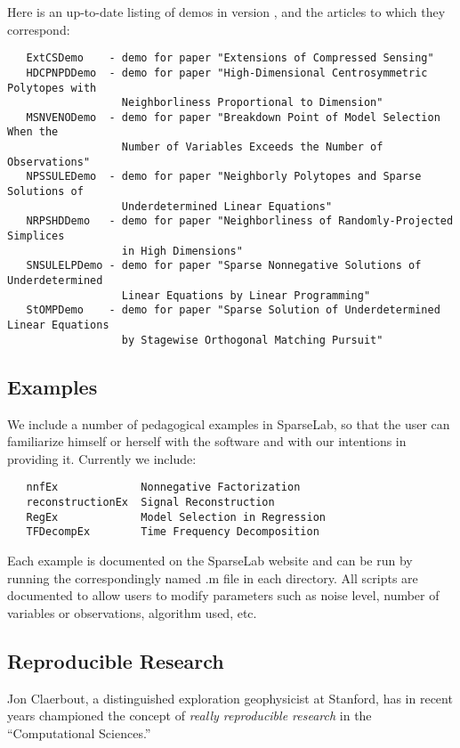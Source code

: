 \documentclass{article}
\begin{document}
Here is an up-to-date listing of demos in version \WLVersion,
and the articles to which they correspond:
\begin{verbatim}
   ExtCSDemo    - demo for paper "Extensions of Compressed Sensing"
   HDCPNPDDemo  - demo for paper "High-Dimensional Centrosymmetric Polytopes with
                  Neighborliness Proportional to Dimension"
   MSNVENODemo  - demo for paper "Breakdown Point of Model Selection When the
                  Number of Variables Exceeds the Number of Observations"
   NPSSULEDemo  - demo for paper "Neighborly Polytopes and Sparse Solutions of
                  Underdetermined Linear Equations"
   NRPSHDDemo   - demo for paper "Neighborliness of Randomly-Projected Simplices
                  in High Dimensions"
   SNSULELPDemo - demo for paper "Sparse Nonnegative Solutions of Underdetermined
                  Linear Equations by Linear Programming"
   StOMPDemo    - demo for paper "Sparse Solution of Underdetermined Linear Equations
                  by Stagewise Orthogonal Matching Pursuit"
\end{verbatim}


\subsection{Examples}

We include a number of pedagogical examples in SparseLab, so that
the user can familiarize himself or herself with the software and
with our intentions in providing it. Currently we include:
\begin{verbatim}
   nnfEx             Nonnegative Factorization
   reconstructionEx  Signal Reconstruction
   RegEx             Model Selection in Regression
   TFDecompEx        Time Frequency Decomposition
\end{verbatim}

Each example is documented on the SparseLab website and can be run by running the correspondingly
named .m file in each directory. All scripts are documented to allow users to modify parameters
such as noise level, number of variables or observations, algorithm used, etc.

\subsection{Reproducible Research}

Jon Claerbout, a distinguished exploration geophysicist at Stanford, has in recent years championed
the concept of {\it really reproducible research} in the ``Computational Sciences.''
\end{document}
